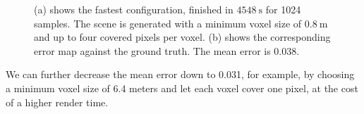 \begin{figure}[t]
\begin{subfigure}[b]{\linewidth}
{        }
        \caption{}
    \end{subfigure}
    \begin{subfigure}[b]{\linewidth}
        \caption{}
    \end{subfigure}
    \caption[Rendering and \FLIP error map of the fastest combination]{(a) shows the fastest configuration, finished in $\SI{4548}{\s}$ for 1024 samples. The scene is generated with a minimum voxel size of $\SI{0.8}{\m}$ and up to four covered pixels per voxel. (b) shows the corresponding \FLIP error map against the ground truth. The mean \FLIP error is 0.038.}
    \label{fig:render_and_error_fastest}
\end{figure}
We can further decrease the mean \FLIP error down to 0.031, for example, by choosing a minimum voxel size of 6.4 meters and let each voxel cover one pixel, at the cost of a higher render time.

